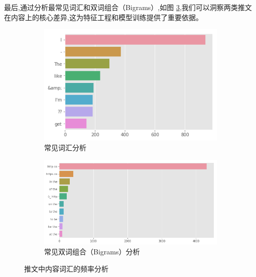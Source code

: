 最后,通过分析最常见词汇和双词组合（Bigrams）,如图 \ref{fig:lstm_eda_content},我们可以洞察两类推文在内容上的核心差异,这为特征工程和模型训练提供了重要依据。
\begin{figure}[htbp]
    \centering
    \begin{subfigure}[b]{0.48\textwidth}
        \centering
        \includegraphics[width=\textwidth]{figures/LSTM9.png}
        \caption{常见词汇分析}
        \label{fig:common_words}
    \end{subfigure}
    \hfill
    \begin{subfigure}[b]{0.48\textwidth}
        \centering
        \includegraphics[width=\textwidth]{figures/LSTM10.png}
        \caption{常见双词组合（Bigrams）分析}
        \label{fig:common_bigrams}
    \end{subfigure}
    \caption{推文中内容词汇的频率分析}
    \label{fig:lstm_eda_content}
\end{figure}


